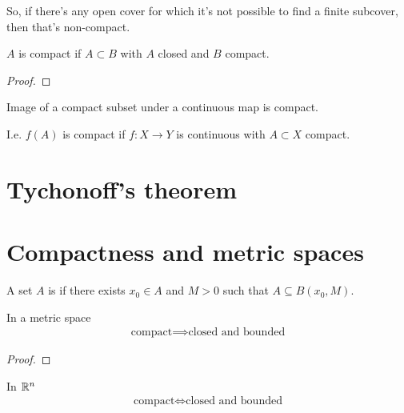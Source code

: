 So, if there's any open cover for which it's not possible to find a finite subcover, then that's non-compact.

\begin{theorem*}[20.11]
  $A$ is compact if $A \subset B$ with $A$ closed and $B$ compact.
\end{theorem*}

\begin{proof}
\end{proof}

\begin{theorem}[20.12]
  Image of a compact subset under a continuous map is compact.

  I.e. $f(A)$ is compact if $f: X \to Y$ is continuous with $A \subset X$ compact.
\end{theorem}

\begin{theorem*}[20.13]
\end{theorem*}

\section{Tychonoff's theorem}


\section{Compactness and metric spaces}

\begin{definition*}
  A set $A$ is  if there exists $x_0 \in A$ and $M > 0$ such that $A \subseteq B(x_0, M)$.
\end{definition*}

\begin{theorem*}
  In a metric space
  \begin{align*}
    \text{compact} \implies \text{closed and bounded}
  \end{align*}
\end{theorem*}

\begin{proof}
\end{proof}

\begin{theorem}
  In $\mathbb{R}^n$
  \begin{align*}
    \text{compact} \iff \text{closed and bounded}
  \end{align*}
\end{theorem}

